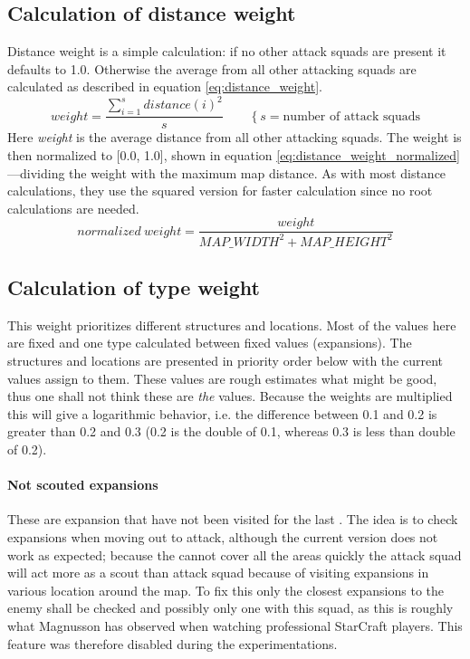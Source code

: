 \subsection{Calculation of distance weight}
Distance weight is a simple calculation: if no other attack squads are present it defaults to 1.0. Otherwise the average from all other attacking squads are calculated as described in equation \ref{eq:distance_weight}.
\begin{equation}
\label{eq:distance_weight}
weight = \frac{\sum_{i=1}^{s}{distance(i)^2}}{s} \qquad \left\{s = \text{number of attack squads}\right.
\end{equation}
Here \emph{weight} is the average distance from all other attacking squads. The weight is then normalized to [0.0, 1.0], shown in equation \ref{eq:distance_weight_normalized}—dividing the weight with the maximum map distance. As with most distance calculations, they use the squared version for faster calculation since no root calculations are needed.
\begin{equation}
\label{eq:distance_weight_normalized}
normalized\ weight = \frac{weight}{MAP\_WIDTH^2 + MAP\_HEIGHT^2}
\end{equation}


\subsection{Calculation of type weight}
This weight prioritizes different structures and locations. Most of the values here are fixed and one type calculated between fixed values (expansions). The structures and locations are presented in priority order below with the current values assign to them. These values are rough estimates what might be good, thus one shall not think these are \emph{the} values. Because the weights are multiplied this will give a logarithmic behavior, i.e. the difference between 0.1 and 0.2 is greater than 0.2 and 0.3 (0.2 is the double of 0.1, whereas 0.3 is less than double of 0.2).

\paragraph{Not scouted expansions \attackCoordinatorWeightsExpansionNotChecked}
These are expansion that have not been visited for the last \attackCoordinatorExpansionNotCheckedTime. The idea is to check expansions when moving out to attack, although the current version does not work as expected; because the  cannot cover all the areas quickly the attack squad will act more as a scout than attack squad because of visiting expansions in various location around the map. To fix this only the closest expansions to the enemy shall be checked and possibly only one with this squad, as this is roughly what Magnusson has observed when watching professional StarCraft players. This feature was therefore disabled during the experimentations.
	
